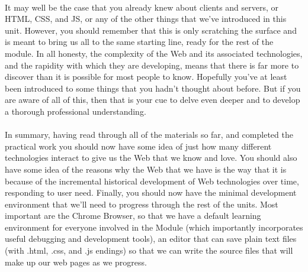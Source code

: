 \paragraph{} It may well be the case that you already knew about clients and servers, or HTML, CSS, and JS, or any of the other things that we've introduced in this unit. However, you should remember that this is only scratching the surface and is meant to bring us all to the same starting line, ready for the rest of the module. In all honesty, the complexity of the Web and its associated technologies, and the rapidity with which they are developing, means that there is far more to discover than it is possible for most people to know. Hopefully you've at least been introduced to some things that you hadn't thought about before. But if you are aware of all of this, then that is your cue to delve even deeper and to develop a thorough professional understanding.
\paragraph{} In summary, having read through all of the materials so far, and completed the practical work you should now have some idea of just how many different technologies interact to give us the Web that we know and love. You should also have some idea of the reasons why the Web that we have is the way that it is because of the incremental historical development of Web technologies over time, responding to user need. Finally, you should now have the minimal development environment that we'll need to progress through the rest of the units. Most important are the Chrome Browser, so that we have a default learning environment for everyone involved in the Module (which importantly incorporates useful debugging and development tools), an editor that can save plain text files (with .html, .css, and .js endings) so that we can write the source files that will make up our web pages as we progress.


